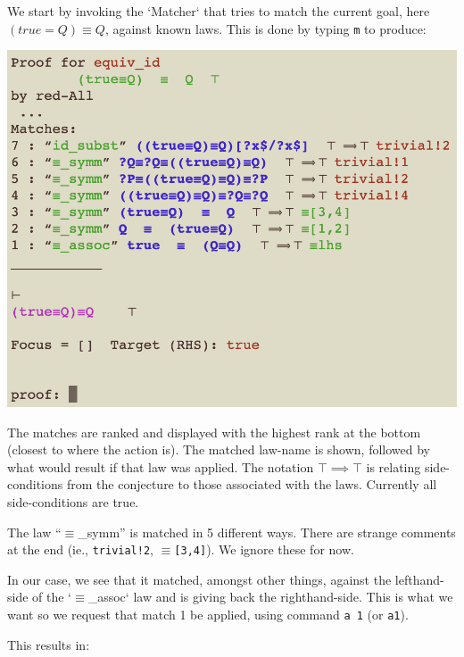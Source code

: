 \documentclass[11pt]{article}
\begin{document}
We start by invoking the `Matcher` that tries to match the current
goal, here $(true=Q)\equiv Q$, against known laws.
This is done by typing \verb"m" to produce:

\includegraphics[scale=0.75]{doc/images/1-m.png}

The matches are ranked and displayed with the highest rank at the bottom
(closest to where the action is).
The matched law-name is shown, followed by what would result if that law was
applied. The notation $\top \implies \top$ is relating side-conditions from
the conjecture to those associated with the laws. 
Currently all side-conditions are true.

The law ``$\equiv$\_symm'' is matched in 5 different ways.
There are strange comments at the end 
(ie., {\color{red}\texttt{trivial!2}}, {\color{green!50!black}$\equiv$\texttt{[3,4]}}).
We ignore these for now.

In our case, we see that it matched, amongst other things,
against the lefthand-side
of the `$\equiv$\_assoc` law and is giving back the righthand-side. 
This is what we want so we request that match 1 be applied,
using command \verb"a 1" (or \verb"a1").

\newpage
This results in:
\end{document}
